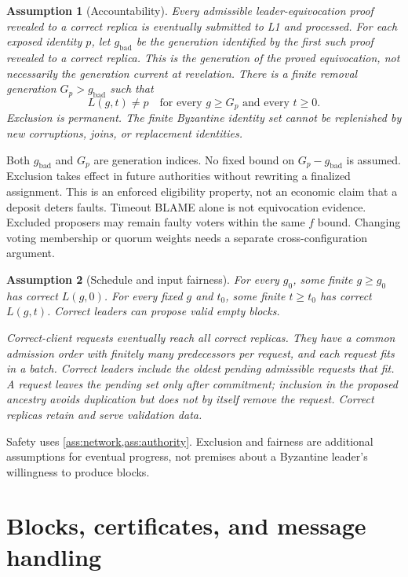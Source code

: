 \documentclass[11pt,a4paper]{article}
\newtheorem{assumption}[assumption]{Assumption}
\begin{document}
\begin{assumption}[Accountability]
\label{ass:exclusion}
Every admissible leader-equivocation proof revealed to a correct replica
is eventually submitted to L1 and processed. For each exposed identity $p$,
let $g_{\mathrm{bad}}$ be the generation identified by the first such proof
revealed to a correct replica. This is the generation of the proved
equivocation, not necessarily the generation current at revelation.
There is a finite removal generation $G_p>g_{\mathrm{bad}}$ such that
\[
 L(g,t)\ne p\quad\text{for every }g\ge G_p\text{ and every }t\ge0.
\]
Exclusion is permanent. The finite Byzantine identity set cannot be
replenished by new corruptions, joins, or replacement identities.
\end{assumption}
Both $g_{\mathrm{bad}}$ and $G_p$ are generation indices. No fixed bound
on $G_p-g_{\mathrm{bad}}$ is assumed. Exclusion takes effect in future
authorities without rewriting a finalized assignment.
This is an enforced eligibility property, not an economic claim that a
deposit deters faults. Timeout BLAME alone is not equivocation evidence.
Excluded proposers may remain faulty voters within the same $f$ bound.
Changing voting membership or quorum weights needs a separate
cross-configuration argument.

\begin{assumption}[Schedule and input fairness]
\label{ass:fairness}
For every $g_0$, some finite $g\ge g_0$ has correct $L(g,0)$.
For every fixed $g$ and $t_0$, some finite $t\ge t_0$ has correct $L(g,t)$.
Correct leaders can propose valid empty blocks.

Correct-client requests eventually reach all correct replicas. They have
a common admission order with finitely many predecessors per request, and
each request fits in a batch. Correct leaders include the oldest pending
admissible requests that fit. A request leaves the pending set only after
commitment; inclusion in the proposed ancestry avoids duplication but
does not by itself remove the request. Correct replicas retain and serve
validation data.
\end{assumption}
Safety uses \cref{ass:network,ass:authority}. Exclusion and fairness are
additional assumptions for eventual progress, not premises about a
Byzantine leader's willingness to produce blocks.

\section{Blocks, certificates, and message handling}
\label{sec:definitions}
\end{document}
